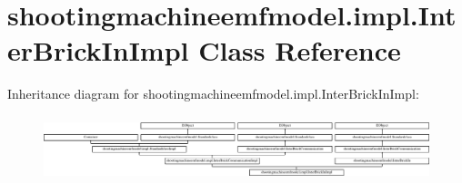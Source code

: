 \hypertarget{classshootingmachineemfmodel_1_1impl_1_1_inter_brick_in_impl}{\section{shootingmachineemfmodel.\-impl.\-Inter\-Brick\-In\-Impl Class Reference}
\label{classshootingmachineemfmodel_1_1impl_1_1_inter_brick_in_impl}
}
Inheritance diagram for shootingmachineemfmodel.\-impl.\-Inter\-Brick\-In\-Impl\-:\begin{figure}[H]
\begin{center}
\leavevmode
\includegraphics[height=1.955307cm]{classshootingmachineemfmodel_1_1impl_1_1_inter_brick_in_impl}
\end{center}
\end{figure}
